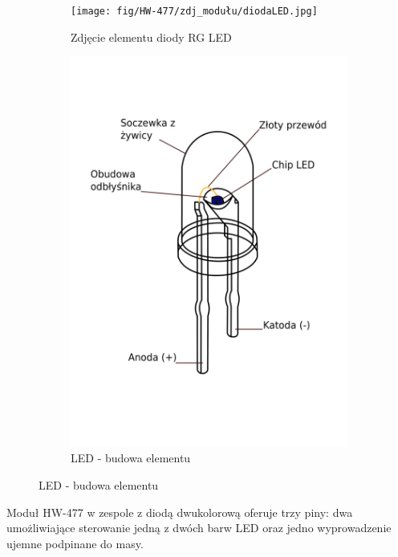 \documentclass[11pt, a4paper]{article}
\begin{document}
\vspace{0.25cm}
\begin{figure}[h]
\centering
\begin{subfigure}{.5\textwidth}
\centering
\texttt{[image: fig/HW-477/zdj\_modułu/diodaLED.jpg]}
\caption{Zdjęcie elementu diody RG LED}
\label{fig:_zdjecie_elementu}
\end{subfigure}%
\begin{subfigure}{.5\textwidth}
\centering
\includegraphics[width=.6\linewidth]{fig/HW-477/zasada_dzialania/rysunek.png}
\caption{LED - budowa elementu}
\label{fig:_zasada_dzialania_elementu}
\end{subfigure}
\label{fig:element}
\end{figure}
\vspace{0.25cm}
\vspace{0.75cm}

Moduł HW-477 w zespole z diodą dwukolorową oferuje trzy piny: dwa umożliwiające sterowanie jedną z dwóch barw LED oraz jedno wyprowadzenie ujemne podpinane do masy.
\end{document}
